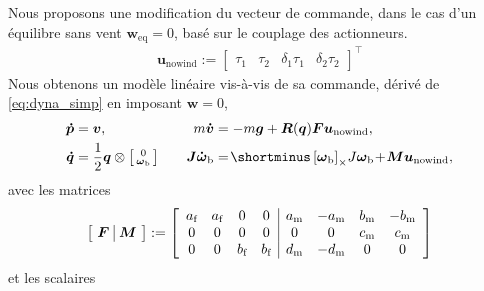     Nous proposons une modification du vecteur de commande, dans le cas d'un équilibre sans vent $\boldsymbol{w}_{\mathrm{eq}} = 0$, basé sur le couplage des actionneurs. 
    \begin{align}
    \boldsymbol{u}_{\text{nowind}} := \begin{bmatrix}\tau_{1}  \!&\! \tau_{2}  \!&\! \delta_{1}\tau_{1} \!&\! \delta_{2}\tau_{2} \end{bmatrix}^\top
    \end{align}
    Nous obtenons un modèle linéaire vis-à-vis de sa commande, dérivé de \eqref{eq:dyna_simp} en imposant  $\boldsymbol{w} = 0$,
    \begin{subequations}\label{eq:withouwind}
    \begin{align}
            \boldsymbol{\dot p} &=  \boldsymbol{v}, \quad &
            m\boldsymbol{\dot v} &= - m\boldsymbol{g} +  \boldsymbol{R}(\boldsymbol{q})\boldsymbol{F}\boldsymbol{u}_{\text{nowind}},\\
            \boldsymbol{\dot q} &= \frac{1}{2}\boldsymbol{q} \otimes \smallmat{0 \\ \boldsymbol{\omega}_{\text{b}}} \quad & \boldsymbol{J} \boldsymbol{\dot \omega}_{\text{b}} &= \! \shortminus \skewsym{\boldsymbol{\omega}_{\text{b}}}\!J\boldsymbol{\omega}_{\text{b}} \! + \! \boldsymbol{M}\boldsymbol{u}_{\text{nowind}},
    \end{align}
    \end{subequations}
    avec les matrices
    \begin{align*}
        \left[ \begin{array}{c|c}\!\boldsymbol{F}\!&\!\boldsymbol{M}\!\end{array} \right] := \left[ \begin{array}{cccc | cccc} a_{\text{f}} & a_{\text{f}} & 0 & 0 & a_{\text{m}} & -a_{\text{m}} & b_{\text{m}} & -b_{\text{m}} \\  0 & 0 & 0 & 0 & 0 & 0 & c_{\text{m}} & c_{\text{m}} \\ 0 & 0 & b_{\text{f}} & b_{\text{f}} & d_{\text{m}} & -d_{\text{m}} & 0 & 0 \end{array} \right]
    \end{align*}
    et les scalaires
